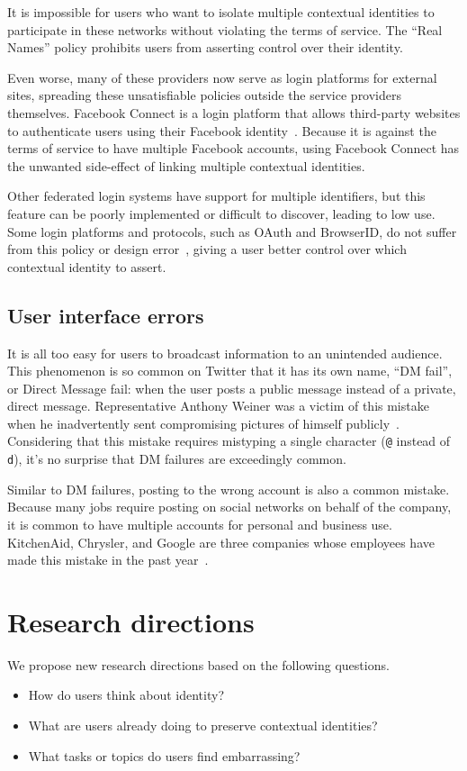 \documentclass[10pt, conference, compsocconf]{IEEEtran}
\begin{document}
It is impossible for users who want to isolate multiple contextual identities
to participate in these networks without violating the terms of service.  The
``Real Names'' policy prohibits users from asserting control over their
identity.

Even worse, many of these providers now serve as login platforms for external
sites, spreading these unsatisfiable policies outside the service providers
themselves.  Facebook Connect is a login platform that allows third-party
websites to authenticate users using their Facebook identity~\cite{fb_connect}.
Because it is against the terms of service to have multiple Facebook accounts,
using Facebook Connect has the unwanted side-effect of linking multiple
contextual identities.

Other federated login systems have support for multiple identifiers, but this
feature can be poorly implemented or difficult to discover, leading to low use.
Some login platforms and protocols, such as OAuth and BrowserID, do not suffer
from this policy or design error~\cite{browserid,oauth}, giving a user better
control over which contextual identity to assert.

\subsection{User interface errors}
It is all too easy for users to broadcast information to
an unintended audience. This phenomenon is so common on Twitter that it has its
own name, ``DM fail'', or Direct Message fail: when the user posts a public
message instead of a private, direct message. Representative Anthony Weiner was
a victim of this mistake when he inadvertently sent compromising pictures of
himself publicly~\cite{weiner}. Considering that this mistake requires
mistyping a single character (\texttt{@} instead of \texttt{d}), it's no
surprise that DM failures are exceedingly common.

Similar to DM failures, posting to the wrong account is also a common mistake.
Because many jobs require posting on social networks on behalf of the company,
it is common to have multiple accounts for personal and business use.
KitchenAid, Chrysler, and Google are three companies whose employees have
made this mistake in the past year~\cite{kitchenaid,chrysler,yegge}.

\section{Research directions}
We propose new research directions based on the following questions.
\begin{itemize}
\item How do users think about identity?
\item What are users already doing to preserve contextual identities?
\item What tasks or topics do users find embarrassing?
\end{itemize}
\end{document}
